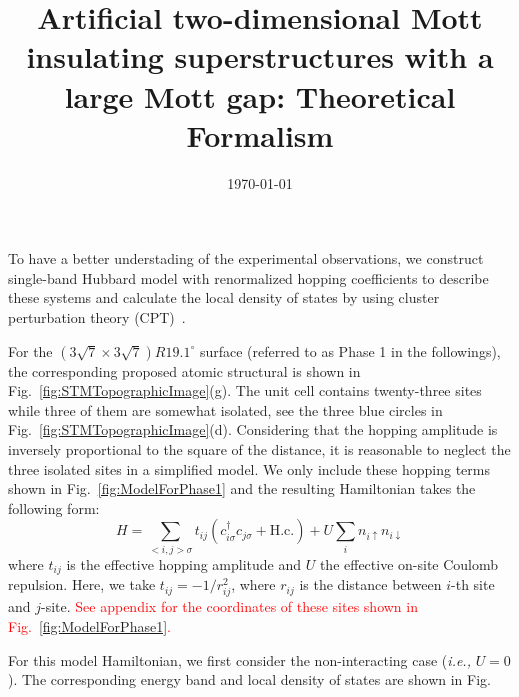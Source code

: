 \documentclass[aps,prl,reprint,amsfonts,amsmath,amssymb,showpacs,groupedaddress,superscriptaddress]{revtex4-1}
\begin{document}
\title{Artificial two-dimensional Mott insulating superstructures with a large Mott gap: Theoretical Formalism}

\date{\today}

\maketitle

To have a better understading of the experimental observations, we construct single-band Hubbard model with renormalized hopping coefficients to describe these systems and calculate the local density of states by using cluster perturbation theory (CPT)~\cite{PhysRevB.48.418,PhysRevLett.84.522}.

For the $(3\sqrt{7} \times 3\sqrt{7})R19.1^\circ$ surface (referred to as Phase 1 in the followings), the corresponding proposed atomic structural is shown in Fig.~\ref{fig:STMTopographicImage}(g). The unit cell contains twenty-three sites while three of them are somewhat isolated, see the three blue circles in Fig.~\ref{fig:STMTopographicImage}(d). Considering that the hopping amplitude is inversely proportional to the square of the distance, it is reasonable to neglect the three isolated sites in a simplified model. We only include these hopping terms shown in Fig.~\ref{fig:ModelForPhase1} and the resulting Hamiltonian takes the following form:
\begin{equation}
    H = \sum_{<i,j>\sigma} t_{ij}(c_{i\sigma}^{\dagger}c_{j\sigma} + \text{H.c.}) + U \sum_{i} n_{i\uparrow} n_{i\downarrow}
    \label{eq:ModelHamiltonian}
\end{equation}
where $t_{ij}$ is the effective hopping amplitude and $U$ the effective on-site Coulomb repulsion. Here, we take $t_{ij} = -1/r_{ij}^{2}$, where $r_{ij}$ is the distance between $i$-th site and $j$-site.
\textcolor{red}{See appendix for the coordinates of these sites shown in Fig.~\ref{fig:ModelForPhase1}.}

For this model Hamiltonian, we first consider the non-interacting case (\textit{i.e.,} $U = 0$). The corresponding energy band and local density of states are shown in Fig.
\end{document}
